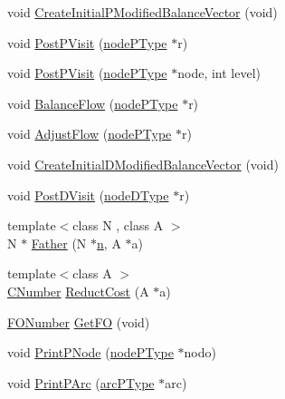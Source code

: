 \begin{DoxyCompactItemize}
void \mbox{\hyperlink{class_m_c_f_simplex_a71015ef7f5966edd56837eaf9d1b55c5}{Create\+Initial\+P\+Modified\+Balance\+Vector}} (void)
\item 
void \mbox{\hyperlink{class_m_c_f_simplex_afd8ddcf98caa5282576d17eb2acc51eb}{Post\+P\+Visit}} (\mbox{\hyperlink{struct_m_c_f_simplex_1_1node_p_type}{node\+P\+Type}} $\ast$r)
\item 
void \mbox{\hyperlink{class_m_c_f_simplex_a83dcee84696fcb76852de9336170e24c}{Post\+P\+Visit}} (\mbox{\hyperlink{struct_m_c_f_simplex_1_1node_p_type}{node\+P\+Type}} $\ast$node, int level)
\item 
void \mbox{\hyperlink{class_m_c_f_simplex_a88df387dd2a8a70bfbcc10e0fbdad384}{Balance\+Flow}} (\mbox{\hyperlink{struct_m_c_f_simplex_1_1node_p_type}{node\+P\+Type}} $\ast$r)
\item 
void \mbox{\hyperlink{class_m_c_f_simplex_a7ac93fd83a5b0573c42db4f73815d82d}{Adjust\+Flow}} (\mbox{\hyperlink{struct_m_c_f_simplex_1_1node_p_type}{node\+P\+Type}} $\ast$r)
\item 
void \mbox{\hyperlink{class_m_c_f_simplex_a9ce3f3e0f7f55dd953f4bef653381251}{Create\+Initial\+D\+Modified\+Balance\+Vector}} (void)
\item 
void \mbox{\hyperlink{class_m_c_f_simplex_aa98d544e1a201379d347de4e9aaaaf61}{Post\+D\+Visit}} (\mbox{\hyperlink{struct_m_c_f_simplex_1_1node_d_type}{node\+D\+Type}} $\ast$r)
\item 
{\footnotesize template$<$class N , class A $>$ }\\N $\ast$ \mbox{\hyperlink{class_m_c_f_simplex_aebb13b76385502fc2dbc8897ed848554}{Father}} (N $\ast$\mbox{\hyperlink{class_m_c_f_class_a7f0f8bcc88c30609d766a4e723a53dac}{n}}, A $\ast$a)
\item 
{\footnotesize template$<$class A $>$ }\\\mbox{\hyperlink{class_m_c_f_class_a24d0627ba8213afe1ec4ebeb4508e8f1}{C\+Number}} \mbox{\hyperlink{class_m_c_f_simplex_a7d2dd2965903fbbc7a55dee9e025d7a9}{Reduct\+Cost}} (A $\ast$a)
\item 
\mbox{\hyperlink{class_m_c_f_class_af5ee7b3099b0bc780a6a4b43629488fa}{F\+O\+Number}} \mbox{\hyperlink{class_m_c_f_simplex_a76e7e63ab3db6b52b69a6a2db640e3ec}{Get\+FO}} (void)
\item 
void \mbox{\hyperlink{class_m_c_f_simplex_a875ea0070b80aa1a6e6eaefb6eef6efd}{Print\+P\+Node}} (\mbox{\hyperlink{struct_m_c_f_simplex_1_1node_p_type}{node\+P\+Type}} $\ast$nodo)
\item 
void \mbox{\hyperlink{class_m_c_f_simplex_aafe9e93544458aaf8bcb90c0c885e615}{Print\+P\+Arc}} (\mbox{\hyperlink{struct_m_c_f_simplex_1_1arc_p_type}{arc\+P\+Type}} $\ast$arc)

\end{DoxyCompactItemize}
